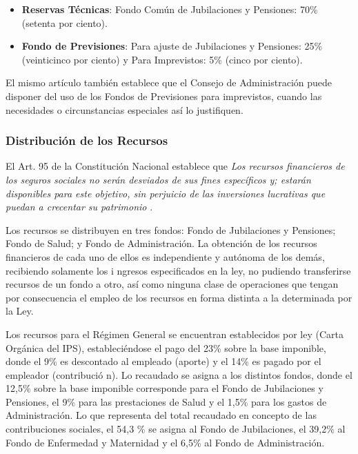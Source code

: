 \begin {itemize}

\item\textbf{Reservas Técnicas}: Fondo Común de Jubilaciones y Pensiones: 70\% (setenta por ciento).

\item\textbf{Fondo de Previsiones}: Para ajuste de Jubilaciones y Pensiones: 25\% (veinticinco por ciento) y    Para Imprevistos: 5\% (cinco por ciento). 

\end{itemize}

El mismo artículo también establece que el Consejo de Administración
puede disponer del uso de los Fondos de Previsiones para imprevistos,
cuando las necesidades o circunstancias especiales así lo justifiquen.

\subsubsection{Distribución de los Recursos}

El Art. 95 de la Constitución Nacional establece que
\textit{Los recursos financieros de los seguros sociales no serán desviados de sus fines específicos y; estarán disponibles para este objetivo, sin perjuicio de las inversiones lucrativas que puedan a
crecentar su patrimonio} \cite{constitucion}.

Los recursos se distribuyen en tres fondos: Fondo de Jubilaciones y
Pensiones; Fondo de Salud; y Fondo de Administración. La obtención de
los recursos financieros de cada uno de ellos es independiente y
autónoma de los demás, recibiendo solamente los i ngresos especificados
en la ley, no pudiendo transferirse recursos de un fondo a otro, así
como ninguna clase de operaciones que tengan por consecuencia el empleo
de los recursos en forma distinta a la determinada por la Ley.

Los recursos para el Régimen General se encuentran establecidos por ley
(Carta Orgánica del IPS), estableciéndose el pago del 23\% sobre la base
imponible, donde el 9\% es descontado al empleado (aporte) y el 14\% es
pagado por el empleador (contribució n). Lo recaudado se asigna a los
distintos fondos, donde el 12,5\% sobre la base imponible corresponde
para el Fondo de Jubilaciones y Pensiones, el 9\% para las prestaciones
de Salud y el 1,5\% para los gastos de Administración. Lo que representa
del total recaudado en concepto de las contribuciones sociales, el 54,3
\% se asigna al Fondo de Jubilaciones, el 39,2\% al Fondo de Enfermedad
y Maternidad y el 6,5\% al Fondo de Administración.


